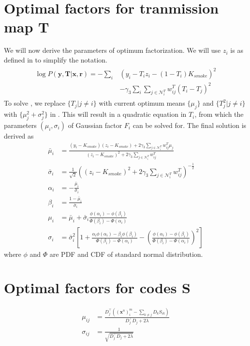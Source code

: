 \appendix
\label{app:factorParamsT}

\chapter{Optimal factors for tranmission map $\mathbf{T}$ }

We will now derive the parameters of optimum factorization. We will use $z_i$ is as defined in  to simplify the notation.
\begin{align}
\begin{split}
\log P \left( \mathbf{y}, \mathbf{T} | \mathbf{x}, \mathbf{r} \right) = - \sum_{i} &\left( y_i - T_i z_i - (1-T_i) K_{smoke} \right)^2 \\ &- \gamma_3 \sum_{i} \sum_{j \in \mathcal{N}_i^T}  w_{ij}^T (T_i - T_j)^2
\end{split}
\label{eqn:derive_1_factvbem1}
\end{align}
To solve , we replace $ \lbrace T_j | j \neq i \rbrace $ with current optimum means $ \lbrace \mu_j \rbrace$ and $ \lbrace T_j^2 | j \neq i \rbrace $ with $ \lbrace \mu_j^2 + \sigma_j^2 \rbrace $ in . This will result in a quadratic equation in $T_i$, from which the parameters $ \left( \mu_i, \sigma_i \right) $ of Gaussian factor $F_i$ can be solved for. The final solution is derived as
\begin{align}
\bar{\mu}_i &= \frac{ \left( y_i - K_{smoke} \right) \left( z_i - K_{smoke} \right) + 2 \gamma_3 \sum_{ j \in \mathcal{N}_i^T } w_{ij}^T \mu_j } { \left( z_i - K_{smoke} \right)^2 + 2 \gamma_3 \sum_{ j \in \mathcal{N}_i^T } w_{ij}^T } \\
\bar{\sigma}_i &= \frac{ 1 } { \sqrt{2} }\left( \left( z_i - K_{smoke} \right)^2 + 2 \gamma_3 \sum_{ j \in \mathcal{N}_i^T } w_{ij}^T \right)^{-\frac{1}{2}}  \\
\alpha_i &= -\frac{\bar\mu_i}{\bar\sigma_i} \\
\beta_i &= \frac{1-\bar\mu_i}{\bar\sigma_i} \\
\mu_i &= \bar\mu_i + \bar\sigma_i \frac{\phi\left(\alpha_i \right) - \phi\left(\beta_i \right)}{\Phi\left(\beta_i \right) - \Phi\left(\alpha_i \right)} \label{eqn:mean_t_vbem1} \\
\sigma_i &= \bar\sigma_i^2 \left[ 1 + \frac{\alpha_i \phi\left(\alpha_i \right) - \beta_i  \phi\left(\beta_i \right)}{\Phi\left(\beta_i \right) - \Phi\left(\alpha_i \right)} - \left(\frac{\phi\left(\alpha_i \right) - \phi\left(\beta_i \right)}{\Phi\left(\beta_i \right) - \Phi\left(\alpha_i \right)} \right)^2 \right] \label{eqn:std_t_vbem1}  
\end{align}
where $\phi$ and $\Phi$ are PDF and CDF of standard normal distribution. 


\chapter{Optimal factors for codes $\mathbf{S}$ }

\begin{align}
\mu_{ij} &= \frac{ D_j^\intercal \left( \left(\mathbf{x}^n\right)_i^m - \sum_{k \neq j} D_k S_{ik} \right) }{ D_j^\intercal D_j + 2 \lambda } \\
\sigma_{ij} &= \frac{1}{\sqrt{ D_j^\intercal D_j + 2 \lambda }}
\end{align}